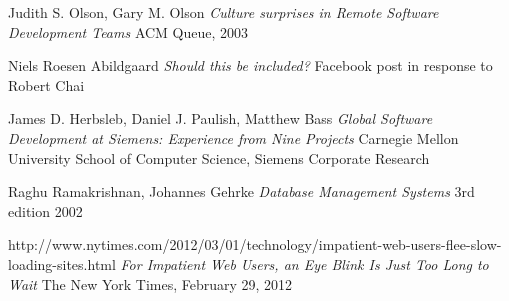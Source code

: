 \begin{thebibliography}{9}

		Judith S. Olson, Gary M. Olson\newline
		\emph{Culture surprises in Remote Software Development Teams}\newline
		ACM Queue, 2003

		Niels Roesen Abildgaard\newline
		\emph{Should this be included?}\newline
		Facebook post in response to Robert Chai

		James D. Herbsleb, Daniel J. Paulish, Matthew Bass\newline
		\emph{Global Software Development at Siemens: Experience from Nine Projects}
		Carnegie Mellon University School of Computer Science,
		Siemens Corporate Research 
	
		Raghu Ramakrishnan, Johannes Gehrke\newline
		\emph{Database Management Systems}\newline
		3rd edition 2002

		http://www.nytimes.com/2012/03/01/technology/impatient-web-users-flee-slow-loading-sites.html\newline
		\emph{For Impatient Web Users, an Eye Blink Is Just Too Long to Wait}\newline
		The New York Times, February 29, 2012

\end{thebibliography}
